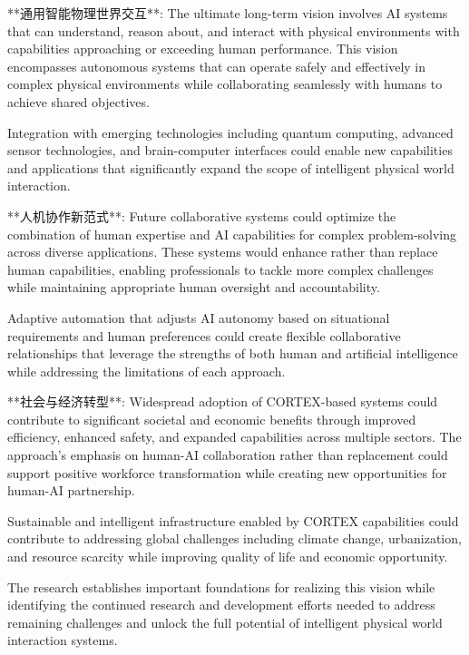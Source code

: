 **通用智能物理世界交互**:
The ultimate long-term vision involves AI systems that can understand, reason about, and interact with physical environments with capabilities approaching or exceeding human performance. This vision encompasses autonomous systems that can operate safely and effectively in complex physical environments while collaborating seamlessly with humans to achieve shared objectives.

Integration with emerging technologies including quantum computing, advanced sensor technologies, and brain-computer interfaces could enable new capabilities and applications that significantly expand the scope of intelligent physical world interaction.

**人机协作新范式**:
Future collaborative systems could optimize the combination of human expertise and AI capabilities for complex problem-solving across diverse applications. These systems would enhance rather than replace human capabilities, enabling professionals to tackle more complex challenges while maintaining appropriate human oversight and accountability.

Adaptive automation that adjusts AI autonomy based on situational requirements and human preferences could create flexible collaborative relationships that leverage the strengths of both human and artificial intelligence while addressing the limitations of each approach.

**社会与经济转型**:
Widespread adoption of CORTEX-based systems could contribute to significant societal and economic benefits through improved efficiency, enhanced safety, and expanded capabilities across multiple sectors. The approach's emphasis on human-AI collaboration rather than replacement could support positive workforce transformation while creating new opportunities for human-AI partnership.

Sustainable and intelligent infrastructure enabled by CORTEX capabilities could contribute to addressing global challenges including climate change, urbanization, and resource scarcity while improving quality of life and economic opportunity.

The research establishes important foundations for realizing this vision while identifying the continued research and development efforts needed to address remaining challenges and unlock the full potential of intelligent physical world interaction systems. 